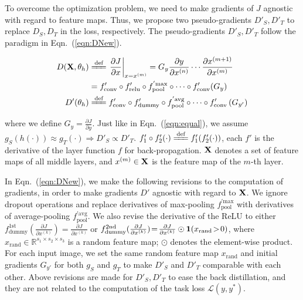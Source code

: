 \documentclass[10pt,twocolumn,letterpaper]{article}
\begin{document}
To overcome the optimization problem, we need to make gradients of $J$ agnostic with regard to feature maps. Thus, we propose two pseudo-gradients {\small$D'_{S},D'_{T}$} to replace {\small$D_{S},D_{T}$} in the loss, respectively. The pseudo-gradients {\small$D'_{S},D'_{T}$} follow the paradigm in Eqn.~(\ref{eqn:DNew}).
\begin{small}
\begin{subequations}
\begin{align}
D({\bf X},\theta_{h})&\xlongequal[]{\textrm{def}}\left.\frac{\partial J}{\partial x}\right|_{x=x^{(m)}}=G_{y}\frac{\partial y}{\partial x^{(n)}}\cdots\frac{\partial x^{(m+1)}}{\partial x^{(m)}}\label{eqn:D}\\
&=f'_{\textrm{conv}}\circ f'_{\textrm{relu}}\circ f_{\textrm{pool}}^{'\textrm{max}}\circ\cdots\circ f'_{\textrm{conv}}(G_{y})\nonumber\\
D'(\theta_{h})&\xlongequal[]{\textrm{def}}f'_{\textrm{conv}}\circ f'_{\textrm{dummy}}\circ f_{\textrm{pool}}^{'\textrm{avg}}\circ\cdots\circ f'_{\textrm{conv}}\left(G_{y'}\right)\label{eqn:DNew}
\end{align}
\end{subequations}
\end{small}
where we define {\small$G_{y}=\frac{\partial J}{\partial y}$}. Just like in Eqn.~(\ref{eqn:equal}), we assume {\small$g_{S}(h(\cdot))\approx g_{T}(\cdot)\Rightarrow D'_{S}\propto D'_{T}$}. {\small$f'_1\circ f'_2(\cdot)\xlongequal[]{\textrm{def}}f'_1(f'_2(\cdot))$}, each $f'$ is the derivative of the layer function $f$ for back-propagation. {\small${\bf X}$} denotes a set of feature maps of all middle layers, and {\small$x^{(m)}\in{\bf X}$} is the feature map of the $m$-th layer.

In Eqn.~(\ref{eqn:DNew}), we make the following revisions to the computation of gradients, in order to make gradients {\small$D'$} agnostic with regard to {\small${\bf X}$}. We ignore dropout operations and replace derivatives of max-pooling {\small$f_{\textrm{pool}}^{'\textrm{max}}$} with derivatives of average-pooling {\small$f_{\textrm{pool}}^{'\textrm{avg}}$}. We also revise the derivative of the ReLU to either {\small$f^{\textrm{1st}}_{\textrm{dummy}}(\frac{\partial J}{\partial x^{(k)}})\!=\!\frac{\partial J}{\partial x^{(k)}}$} or {\small$f^{\textrm{2nd}}_{\textrm{dummy}}(\frac{\partial J}{\partial x^{(k)}})\!=\!\frac{\partial J}{\partial x^{(k)}}\odot{\bf1}(x_{\textrm{rand}}\!>\!0)$}, where {\small$x_{\textrm{rand}}\!\in\!\mathbb{R}^{s_1\times s_2\times s_3}$} is a random feature map; $\odot$ denotes the element-wise product. For each input image, we set the same random feature map {\small$x_{\textrm{rand}}$} and initial gradients {\small$G_{y'}$} for both {\small$g_{S}$} and {\small$g_{T}$} to make {\small$D'_{S}$} and {\small$D'_{T}$} comparable with each other. Above revisions are made for {\small$D'_{S},D'_{T}$} to ease the back distillation, and they are not related to the computation of the task loss {\small$\mathcal{L}(y,y^{*})$}.
\end{document}
